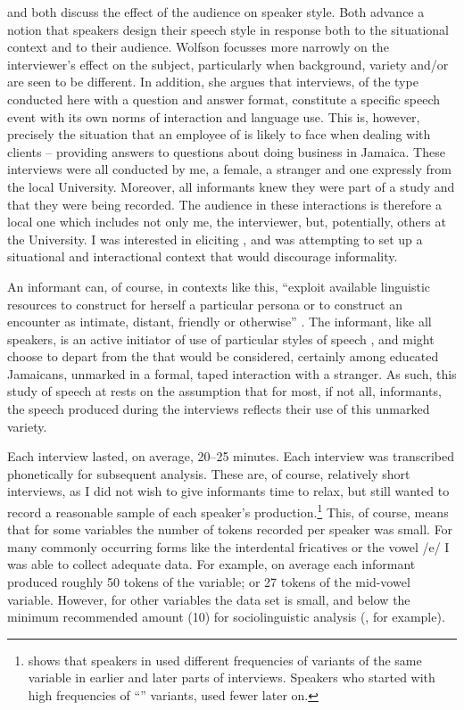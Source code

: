 \citet{Wolfson1976} and \citet{Bell1984} both discuss the effect of the audience on speak\-er style.  Both advance a notion that speakers design their speech style in response both to the situational context and to their audience.  Wolfson focusses more narrowly on the interviewer’s effect on the subject, particularly when background, variety and\slash or  are seen to be different.  In addition, she argues that interviews, of the type conducted here with a question and answer format, constitute a specific speech event with its own norms of interaction and language use.  This is, however, precisely the situation that an employee of  is likely to face when dealing with clients – providing answers to questions about doing business in Jamaica.  These interviews were all conducted by me, a female, a stranger and one expressly from the local University.  Moreover, all informants knew they were part of a study and that they were being recorded.  The audience in these interactions is therefore a local one which includes not only me, the interviewer, but, potentially, others at the University.  I was interested in eliciting , and was attempting to set up a situational and interactional context that would discourage informality.  

An informant can, of course, in contexts like this, “exploit available linguistic resources to construct for herself a particular persona or to construct an encounter as intimate, distant, friendly or otherwise” \citep[206]{MilroyGordon2003}.  The informant, like all speakers, is an active initiator of use of particular styles of speech \citep{RickfordMcNair1994}, and might choose to depart from the  that would be considered, certainly among educated Jamaicans, unmarked in a formal, taped interaction with a stranger.  As such, this study of speech at  rests on the assumption that for most, if not all, informants, the speech produced during the interviews reflects their use of this unmarked variety.        

Each interview lasted, on average, 20--25 minutes.  Each interview was transcribed phonetically for subsequent analysis.  These are, of course, relatively short interviews, as I did not wish to give informants time to relax, but still wanted to record a reasonable sample of each speaker’s production.{\footnote{\citet[188, 191]{Young1973} shows that speakers in  used different frequencies of variants of the same variable in earlier and later parts of interviews.  Speakers who started with high frequencies of “” variants, used fewer later on.}}   This, of course, means that for some variables the number of tokens recorded per speaker was small.  For many commonly occurring forms like the interdental fricatives or the vowel /e/ I was able to collect adequate data.  For example, on average each informant produced roughly 50 tokens of the  variable; or 27 tokens of the mid-vowel variable.  However, for other variables the data set is small, and below the minimum recommended amount (10) for sociolinguistic analysis (\citealt[164]{MilroyGordon2003}, for example).    

